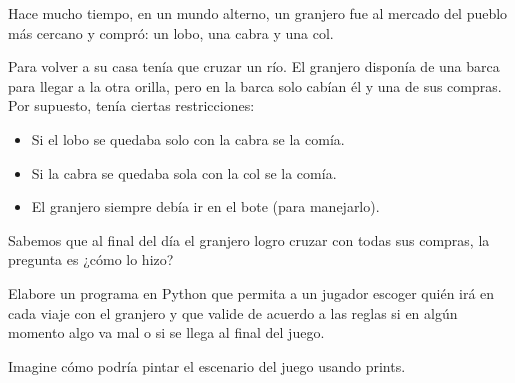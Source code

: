 \begin{Exercise}[title={El juego del granjero}]	
	Hace mucho tiempo, en un mundo alterno, un granjero fue al mercado del pueblo más cercano y compró: un lobo, una cabra y una col.
	
	Para volver a su casa tenía que cruzar un río. El granjero disponía de una barca para llegar a la otra orilla, pero en la barca solo cabían él y una de sus compras. Por supuesto, tenía ciertas restricciones:
	\begin{itemize}
		\item Si el lobo se quedaba solo con la cabra se la comía.
		\item Si la cabra se quedaba sola con la col se la comía.
		\item El granjero siempre debía ir en el bote (para manejarlo).
	\end{itemize}

	Sabemos que al final del día el granjero logro cruzar con todas sus compras, la pregunta es ¿cómo lo hizo?
	
	Elabore un programa en Python que permita a un jugador escoger quién irá en cada
	viaje con el granjero y que valide de acuerdo a las reglas si en algún momento algo va mal o si se llega al final del juego.
	
	Imagine cómo podría pintar el escenario del juego usando prints.
	 
\end{Exercise}
\begin{Answer}	
	
	\newpage
\end{Answer}
